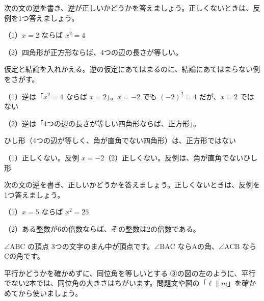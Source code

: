 \begin{reidai}[逆と反例]
次の文の逆を書き、逆が正しいかどうかを答えましょう。正しくないときは、反例を1つ答えましょう。\par
（1）$x=2$ ならば $x^2=4$\par
（2）四角形が正方形ならば、4つの辺の長さが等しい。\par
\kangaekata 仮定と結論を入れかえる。逆の仮定にあてはまるのに、結論にあてはまらない例をさがす。\par
\shiki（1）逆は「$x^2=4$ ならば $x=2$」。$x=-2$ でも $(-2)^2=4$ だが、$x=2$ ではない\par
\hspace*{2.6\zw}（2）逆は「4つの辺の長さが等しい四角形ならば、正方形」。\par
\hspace*{4.6\zw}ひし形（4つの辺が等しく、角が直角でない四角形）は、正方形ではない\par
\kotae（1）正しくない。反例 $x=-2$\quad（2）正しくない。反例は、角が直角でないひし形
\end{reidai}

\begin{jibun}
次の文の逆を書き、正しいかどうかを答えましょう。正しくないときは、反例を1つ答えましょう。\par
（1）$x=5$ ならば $x^2=25$\par
（2）ある整数が6の倍数ならば、その整数は2の倍数である。
\end{jibun}


\begin{tsumazuki}{$\angle\mathrm{ABC}$ の頂点}
3つの文字のまん中が頂点です。$\angle\mathrm{BAC}$ ならAの角、$\angle\mathrm{ACB}$ ならCの角です。
\end{tsumazuki}

\begin{tsumazuki}{平行かどうかを確かめずに、同位角を等しいとする}
③の図の左のように、平行でない2本では、同位角の大きさはちがいます。問題文や図の「$\ell\parallel m$」を確かめてから使いましょう。
\end{tsumazuki}

